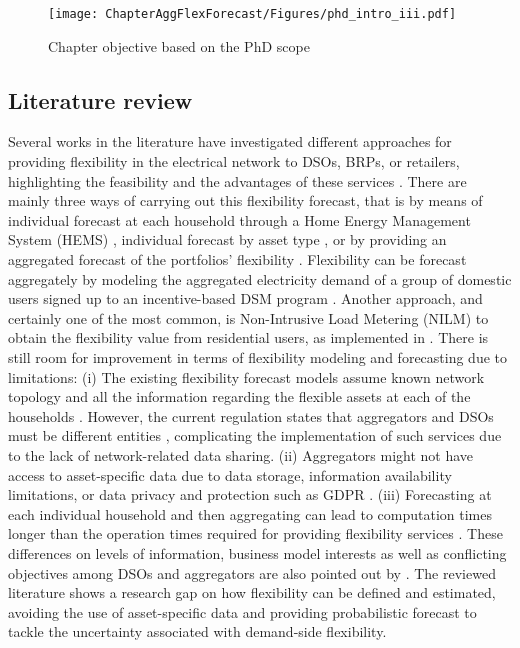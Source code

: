 \begin{figure}[]
	\centering
	\texttt{[image: ChapterAggFlexForecast/Figures/phd\_intro\_iii.pdf]}
		\caption{Chapter objective based on the PhD scope}
	\label{fig:chapter_obj_ii}  
\end{figure}

\subsection{Literature review}
Several works in the literature have investigated different approaches for providing flexibility in the electrical network to DSOs, BRPs, or retailers, highlighting the feasibility and the advantages of these services \cite{Huber2020, Bodal2017, Gorria2013, Pinto2017,Lucas2019, Yue2020}. There are mainly three ways of carrying out this flexibility forecast, that is by means of individual forecast at each household through a Home Energy Management System (HEMS) \cite{Pinto2017}, individual forecast by asset type \cite{Huber2020}, or by providing an aggregated forecast of the portfolios' flexibility \cite{Bodal2017}. Flexibility can be forecast aggregately by modeling the aggregated electricity demand of a group of domestic users signed up to an incentive-based DSM program \cite{Gorria2013}. Another approach, and certainly one of the most common, is Non-Intrusive Load Metering (NILM) to obtain the flexibility value from residential users, as implemented in  \cite{Lucas2019, Yue2020}. %
There is still room for improvement in terms of flexibility modeling and forecasting due to limitations: (i) The existing flexibility forecast models assume known network topology and all the information regarding the flexible assets at each of the households \cite{Pinto2017, Gorria2013}. However, the current regulation states that aggregators and DSOs must be different entities \cite{Guldbaek2017, BEUC2018, EuropeanParliament2019}, complicating the implementation of such services due to the lack of network-related data sharing. (ii) Aggregators might not have access to asset-specific data due to data storage, information availability limitations, or data privacy and protection such as GDPR \cite{GDPR1, GDPR2}. (iii) Forecasting at each individual household and then aggregating can lead to computation times longer than the operation times required for providing flexibility services \cite{Olivella2020}. These differences on levels of information, business model interests as well as conflicting objectives among DSOs and aggregators are also pointed out by \cite{Heinrich2020}. The reviewed literature shows a research gap on how flexibility can be defined and estimated, avoiding the use of asset-specific data and providing probabilistic forecast to tackle the uncertainty associated with demand-side flexibility.


